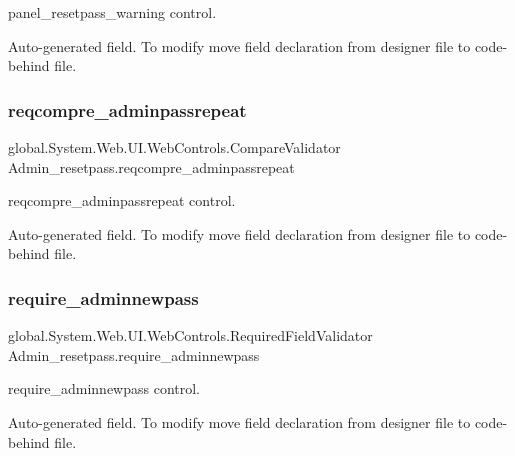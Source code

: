 panel\+\_\+resetpass\+\_\+warning control. 

Auto-\/generated field. To modify move field declaration from designer file to code-\/behind file. \mbox{\label{class_admin__resetpass_ad7b031311d4b32843f8d22db4805b274}} 
\subsubsection{\texorpdfstring{reqcompre\_adminpassrepeat}{reqcompre\_adminpassrepeat}}
{\footnotesize\ttfamily global.\+System.\+Web.\+U\+I.\+Web\+Controls.\+Compare\+Validator Admin\+\_\+resetpass.\+reqcompre\+\_\+adminpassrepeat\hspace{0.3cm}{\ttfamily [protected]}}



reqcompre\+\_\+adminpassrepeat control. 

Auto-\/generated field. To modify move field declaration from designer file to code-\/behind file. \mbox{\label{class_admin__resetpass_a4fc09fc957d2a015058e79a5f95b089a}} 
\subsubsection{\texorpdfstring{require\_adminnewpass}{require\_adminnewpass}}
{\footnotesize\ttfamily global.\+System.\+Web.\+U\+I.\+Web\+Controls.\+Required\+Field\+Validator Admin\+\_\+resetpass.\+require\+\_\+adminnewpass\hspace{0.3cm}{\ttfamily [protected]}}



require\+\_\+adminnewpass control. 

Auto-\/generated field. To modify move field declaration from designer file to code-\/behind file. \mbox{\label{class_admin__resetpass_a5d4dd195dd469a636018fb81350d9745}} 
